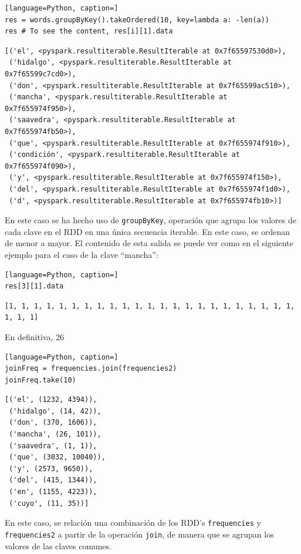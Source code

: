 \documentclass[10pt,swedish, openany]{book}
\begin{document}
\begin{lstlisting}[language=Python, caption=]
res = words.groupByKey().takeOrdered(10, key=lambda a: -len(a))
res # To see the content, res[i][1].data
\end{lstlisting}
\begin{verbatim}
[('el', <pyspark.resultiterable.ResultIterable at 0x7f65597530d0>),
 ('hidalgo', <pyspark.resultiterable.ResultIterable at 0x7f65599c7cd0>),
 ('don', <pyspark.resultiterable.ResultIterable at 0x7f65599ac510>),
 ('mancha', <pyspark.resultiterable.ResultIterable at 0x7f655974f950>),
 ('saavedra', <pyspark.resultiterable.ResultIterable at 0x7f655974fb50>),
 ('que', <pyspark.resultiterable.ResultIterable at 0x7f655974f910>),
 ('condición', <pyspark.resultiterable.ResultIterable at 0x7f655974f090>),
 ('y', <pyspark.resultiterable.ResultIterable at 0x7f655974f150>),
 ('del', <pyspark.resultiterable.ResultIterable at 0x7f655974f1d0>),
 ('d', <pyspark.resultiterable.ResultIterable at 0x7f655974fb10>)]
\end{verbatim}

En este caso se ha hecho uso de \texttt{groupByKey}, operación que agrupa los valores de cada clave en el RDD en una única secuencia iterable. En este caso, se ordenan de menor a mayor. El contenido de esta salida se puede ver como en el siguiente ejemplo para el caso de la clave ``mancha'':

\begin{lstlisting}[language=Python, caption=]
res[3][1].data
\end{lstlisting}
\begin{verbatim}
[1, 1, 1, 1, 1, 1, 1, 1, 1, 1, 1, 1, 1, 1, 1, 1, 1, 1, 1, 1, 1, 1, 1, 1, 1, 1]
\end{verbatim}

En definitiva, 26

\begin{lstlisting}[language=Python, caption=]
joinFreq = frequencies.join(frequencies2)
joinFreq.take(10)
\end{lstlisting}
\begin{verbatim}
[('el', (1232, 4394)),
 ('hidalgo', (14, 42)),
 ('don', (370, 1606)),
 ('mancha', (26, 101)),
 ('saavedra', (1, 1)),
 ('que', (3032, 10040)),
 ('y', (2573, 9650)),
 ('del', (415, 1344)),
 ('en', (1155, 4223)),
 ('cuyo', (11, 35))]
\end{verbatim}

En este caso, se relación una combinación de los RDD's \texttt{frequencies} y \texttt{frequencies2} a partir de la operación \texttt{join}, de manera que se agrupan los valores de las claves comunes.
\end{document}
